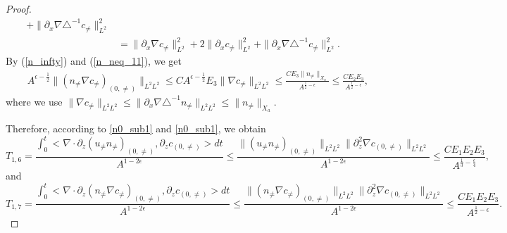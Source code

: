 \documentclass[12pt, reqno]{amsart}
\numberwithin{equation}{section}
\begin{document}
\begin{proof}
\begin{equation}
\begin{aligned}
				+\|\partial_x\nabla\triangle^{-1}c_{\neq}\|_{L^2}^2\\
				&=\|\partial_x\nabla c_{\neq}\|_{L^2}^2
				+2\|\partial_x c_{\neq}\|_{L^2}^2
				+\|\partial_x\nabla\triangle^{-1}c_{\neq}\|_{L^2}^2.		
			\end{aligned}
		\end{equation}
		By  (\ref{n_infty}) and (\ref{n_neq_11}), we get 
		\begin{equation}\label{n0_sub2}
			\begin{aligned}
				&\quad A^{\epsilon-\frac{1}{2}}\|(n_{\neq}\nabla c_{\neq})_{(0,\neq)}\|_{L^2L^2}
				\leq CA^{\epsilon-\frac{1}{2}}E_3
				\|\nabla c_{\neq}\|_{L^2L^2}\leq 
				\frac{CE_3\| n_{\neq}\|_{X_a}}
				{ A^{\frac12-\epsilon}}\leq\frac{CE_2E_3}{ A^{\frac12-\epsilon}},
			\end{aligned}
		\end{equation}
		where we use $\|\nabla c_{\neq}\|_{L^2L^2}\leq 
		\|\partial_x\nabla\triangle^{-1} n_{\neq}\|_{L^2L^2}
		\leq \|n_{\neq}\|_{X_a}.$
		
		Therefore, according to \eqref{n0_sub1} and \eqref{n0_sub1}, we obtain 
		\begin{equation*}
			T_{1,6}
			=\frac{\int_{0}^t<\nabla\cdot\partial_z(u_{\neq}n_{\neq})_{(0,\neq)},
				\partial_zc_{(0,\neq)}>dt}{A^{1-2\epsilon}}
			\leq \frac{\|(u_{\neq} n_{\neq})_{(0,\neq)}\|_{L^2L^2}
				\|\partial_z^2\nabla c_{(0,\neq)}\|_{L^2L^2}}{A^{1-2\epsilon}}\leq 
			\frac{CE_1E_2E_3}{ A^{\frac13-\frac{\epsilon}{4}}},
		\end{equation*}
		and 
		\begin{equation*}
			T_{1,7}
			=\frac{\int_{0}^t<\nabla\cdot\partial_z(n_{\neq}\nabla c_{\neq})_{(0,\neq)},
				\partial_zc_{(0,\neq)}>dt}{A^{1-2\epsilon}}
			\leq \frac{\|(n_{\neq}\nabla c_{\neq} )_{(0,\neq)}\|_{L^2L^2}
				\|\partial_z^2\nabla c_{(0,\neq)}\|_{L^2L^2}}{A^{1-2\epsilon}}\leq 
			\frac{CE_1E_2E_3}{ A^{\frac12-\epsilon}}.
		\end{equation*}
		

\end{proof}
\end{document}
